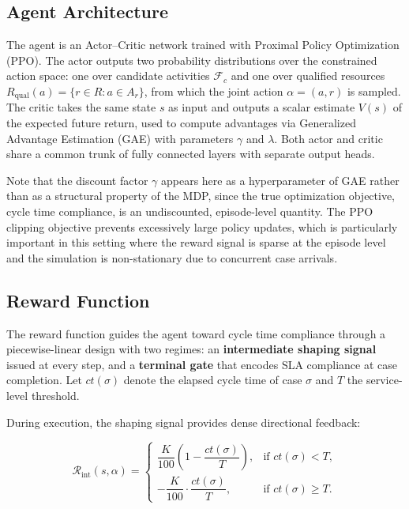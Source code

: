 \documentclass[runningheads]{llncs}
\begin{document}
\subsection{Agent Architecture}
\label{subsec:agent_architecture}

The agent is an Actor--Critic network trained with Proximal Policy Optimization (PPO). The actor outputs two probability distributions over the constrained action space: one over candidate activities $\mathcal{F}_c$ and one over qualified resources $R_{\text{qual}}(a)=\{r\in R : a\in A_r\}$, from which the joint action $\alpha=(a,r)$ is sampled. The critic takes the same state $s$ as input and outputs a scalar estimate $V(s)$ of the expected future return, used to compute advantages via Generalized Advantage Estimation (GAE) with parameters $\gamma$ and $\lambda$. Both actor and critic share a common trunk of fully connected layers with separate output heads.

Note that the discount factor $\gamma$ appears here as a hyperparameter of GAE rather than as a structural property of the MDP, since the true optimization objective, cycle time compliance, is an undiscounted, episode-level quantity. The PPO clipping objective prevents excessively large policy updates, which is particularly important in this setting where the reward signal is sparse at the episode level and the simulation is non-stationary due to concurrent case arrivals.

\subsection{Reward Function}
\label{subsec:reward}

The reward function guides the agent toward cycle time compliance through a
piecewise-linear design with two regimes: an \textbf{intermediate shaping
signal} issued at every step, and a \textbf{terminal gate} that encodes SLA
compliance at case completion. Let $ct(\sigma)$ denote the elapsed cycle time
of case $\sigma$ and $T$ the service-level threshold.

During execution, the shaping signal provides dense directional feedback:

\[
\mathcal{R}_{\text{int}}(s,\alpha)=
\begin{cases}
\dfrac{K}{100}\!\left(1-\dfrac{ct(\sigma)}{T}\right), &
  \text{if } ct(\sigma)<T,\\[10pt]
-\dfrac{K}{100}\cdot\dfrac{ct(\sigma)}{T}, &
  \text{if } ct(\sigma)\ge T.
\end{cases}
\]
\end{document}
